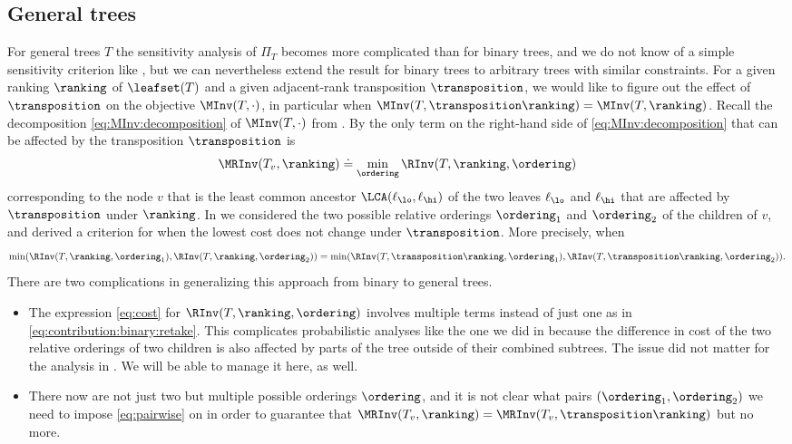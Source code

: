 \subsection{General trees}
\label{sec:connectivity:general}

For general trees $T$ the sensitivity analysis of $\Pi_T$ becomes more complicated than for binary trees, and we do not know of a simple sensitivity criterion like , but we can nevertheless extend the result for binary trees to arbitrary trees with similar constraints. 
For a given ranking $\ranking$ of $\leafset(T)$ and a given adjacent-rank transposition $\transposition$, we would like to figure out the effect of $\transposition$ on the objective $\MInv(T,\cdot)$, in particular when $\MInv(T,\transposition \ranking) = \MInv(T,\ranking)$. Recall the decomposition \eqref{eq:MInv:decomposition} of $\MInv(T,\cdot)$ from . By  the only term on the right-hand side of \eqref{eq:MInv:decomposition} that can be affected by the transposition $\transposition$ is
\[ \MRInv(T_v,\ranking) \doteq \min_\ordering \RInv(T,\ranking,\ordering) \]
corresponding to the node $v$ that is the least common ancestor $\LCA(\ell_\lo,\ell_\hi)$ of the two leaves $\ell_\lo$ and $\ell_\hi$ that are affected by $\transposition$ under $\ranking$. In  we considered the two possible relative orderings $\ordering_1$ and $\ordering_2$ of the children of $v$, and derived a criterion for when the lowest cost does not change under $\transposition$. More precisely, when 
\begin{equation}\label{eq:pairwise}
\min(\RInv(T,\ranking,\ordering_1), \RInv(T,\ranking,\ordering_2)) = \min(\RInv(T,\transposition \ranking,\ordering_1), \RInv(T,\transposition \ranking,\ordering_2)). 
\end{equation}
There are two complications in generalizing this approach from binary to general trees.
\begin{itemize}
\item 
The expression \eqref{eq:cost} for $\RInv(T,\ranking,\ordering)$ involves multiple terms instead of just one as in \eqref{eq:contribution:binary:retake}. This complicates probabilistic analyses like the one we did in  because the difference in cost of the two relative orderings of two children is also affected by parts of the tree outside of their combined subtrees. The issue did not 
matter for the analysis in . We will be able to manage it here, as well.
\item There now are not just two but multiple possible orderings $\ordering$, and it is not clear what pairs $(\ordering_1,\ordering_2)$ we need to impose \eqref{eq:pairwise} on in order to guarantee that $\MRInv(T_v,\ranking) = \MRInv(T_v,\transposition \ranking)$ but no more.
\end{itemize}
